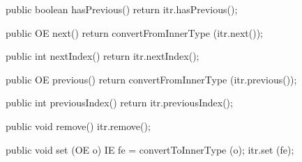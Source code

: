 \begin{code}
\begin{hide}
{      public boolean hasPrevious() {
         return itr.hasPrevious();
      }

      public OE next() {
         return convertFromInnerType (itr.next());
      }

      public int nextIndex() {
         return itr.nextIndex();
      }

      public OE previous() {
         return convertFromInnerType (itr.previous());
      }

      public int previousIndex() {
         return itr.previousIndex();
      }

      public void remove() {
         itr.remove();
      }

      public void set (OE o) {
         IE fe = convertToInnerType (o);
         itr.set (fe);
      }
   }

\end{hide}
\end{code}

\begin{code}\begin{hide}
}\end{hide}
\end{code}
